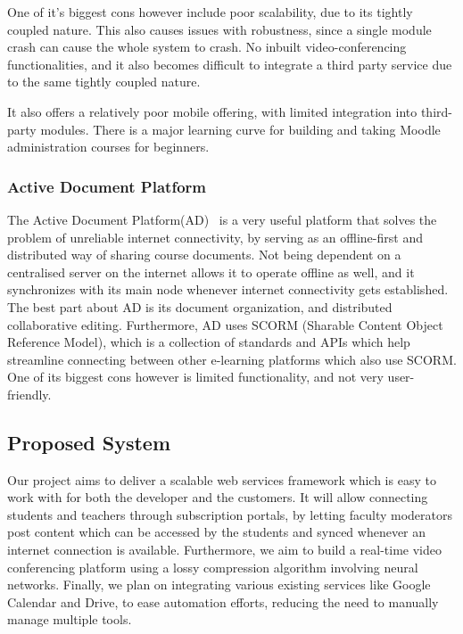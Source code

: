 One of it’s biggest cons however include poor scalability, due to its tightly coupled nature. 
This also causes issues with robustness, since a single module crash can cause the whole system to crash. 
No inbuilt video-conferencing functionalities, and it also becomes difficult to integrate a 
third party service due to the same tightly coupled nature.

It also offers a relatively poor mobile offering, with limited integration into third-party modules. 
There is a major learning curve for building and taking Moodle administration courses for beginners.

\subsubsection{Active Document Platform}
The Active Document Platform(AD)~\cite{ActiveDocument} is a very useful platform that 
solves the problem of unreliable internet connectivity, by serving as an offline-first 
and distributed way of sharing course documents. Not being dependent on a centralised 
server on the internet allows it to operate offline as well, and it synchronizes with 
its main node whenever internet connectivity gets established. The best part about AD 
is its document organization, and distributed collaborative editing. Furthermore, AD 
uses SCORM (Sharable Content Object Reference Model), which is a collection of standards 
and APIs which help streamline connecting between other e-learning platforms which also 
use SCORM. One of its biggest cons however is limited functionality, and not very user-friendly.

\subsection{Proposed System}

Our project aims to deliver a scalable web services framework which is easy to work with 
for both the developer and the customers. It will allow connecting students and teachers 
through subscription portals, by letting faculty moderators post content which can be accessed 
by the students and synced whenever an internet connection is available. 
Furthermore, we aim to build a real-time video conferencing platform using a lossy compression 
algorithm involving neural networks. 
Finally, we plan on integrating various existing services like Google Calendar and Drive, 
to ease automation efforts, reducing the need to manually manage multiple tools.

